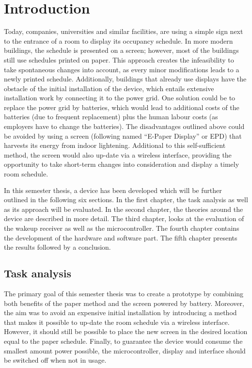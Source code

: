\chapter{Introduction}
Today, companies, universities and similar facilities, are using a simple sign next to the entrance of a room to display its occupancy schedule. In more modern buildings, the schedule is presented on a screen; however, most of the buildings still use schedules printed on paper. This approach creates the infeasibility to take spontaneous changes into account, as every minor modifications leads to a newly printed schedule. Additionally, buildings that already use displays have the obstacle of the initial installation of the device, which entails extensive installation work by connecting it to the power grid. One solution could be to replace the power grid by batteries, which would lead to additional costs of the batteries (due to frequent replacement) plus the human labour costs (as employers have to change the batteries). The disadvantages outlined above could be avoided by using a screen (following named “E-Paper Display” or EPD) that harvests its energy from indoor lightening. Additional to this self-sufficient method, the screen would also up-date via a wireless interface, providing the opportunity to take short-term changes into consideration and display a timely room schedule. 

In this semester thesis, a device has been developed which will be further outlined in the following six sections. 
In the first chapter, the task analysis as well as its approach will be evaluated. In the second chapter, the theories around the device are described in more detail.
The third chapter, looks at the evaluation of the wakeup receiver as well as the microcontroller.
The fourth chapter contains the development of the hardware and software part.
The fifth chapter presents the results followed by a conclusion. 

\section{Task analysis}
The primary goal of this semester thesis was to create a prototype by combining both benefits of the paper method and the screen powered by battery. Moreover, the aim was to avoid an expensive initial installation by introducing a method that makes it possible to up-date the room schedule via a wireless interface. However, it should still be possible to place the new screen in the desired location equal to the paper schedule. Finally, to guarantee the device would consume the smallest amount power possible, the microcontroller, display and interface should be switched off when not in usage.  

